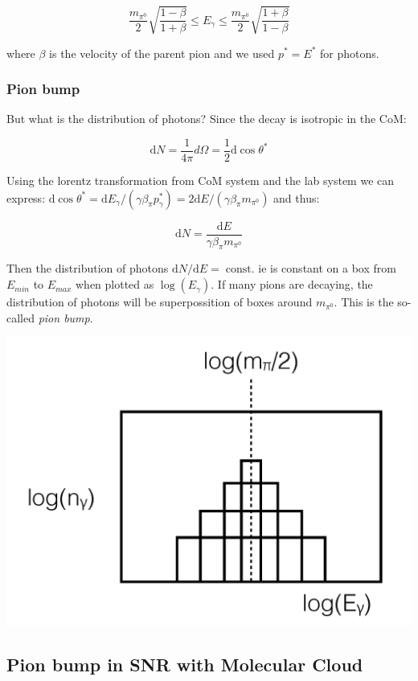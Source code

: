 \documentclass[
  letterpaper,
  DIV=11,
  numbers=noendperiod]{scrreprt}
\begin{document}
\[\frac{m_{\pi^0}}{2}\sqrt{\frac{1-\beta}{1+\beta}} \leq E_\gamma \leq \frac{m_{\pi^0}}{2}\sqrt{\frac{1+\beta}{1-\beta}}\]

where \(\beta\) is the velocity of the parent pion and we used
\(p^* = E^*\) for photons.

\subsubsection{Pion bump}\label{pion-bump}

But what is the distribution of photons? Since the decay is isotropic in
the CoM:

\[\mathrm{d} N  = \frac{1}{4\pi} d\Omega = \frac{1}{2} \mathrm{d}\cos\theta^*\]

Using the lorentz transformation from CoM system and the lab system we
can express:
\(\mathrm{d}\cos\theta^* = \mathrm{d}E_\gamma/(\gamma \beta_\pi p^*_\gamma) = 2\mathrm{d} E/ (\gamma \beta_\pi m_{\pi^0})\)
and thus:

\[\mathrm{d} N = \frac{\mathrm{d} E}{\gamma \beta_\pi m_{\pi^0}}\]

Then the distribution of photons
\(\mathrm{d}N/\mathrm{d}E = \mathrm{\; const.}\) ie is constant on a box
from \(E_{min}\) to \(E_{max}\) when plotted as \(\log(E_\gamma)\). If
many pions are decaying, the distribution of photons will be
superpossition of boxes around \(m_{\pi^0}\). This is the so-called
\emph{pion bump}.

\includegraphics{images/pion_bump.png}

\subsection{Pion bump in SNR with Molecular
Cloud}\label{pion-bump-in-snr-with-molecular-cloud}
\end{document}
